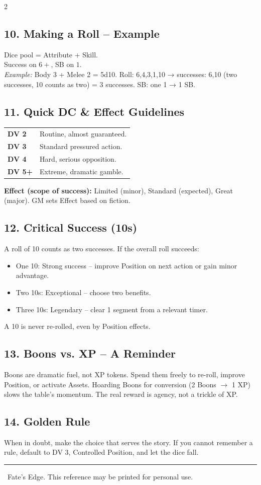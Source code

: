\documentclass[10pt,landscape]{article}
\begin{document}
\begin{multicols}{2}
\subsection*{10. Making a Roll – Example}
Dice pool = Attribute + Skill. \\
Success on $6+$, SB on $1$. \\
\textit{Example:} Body 3 + Melee 2 = 5d10. Roll: 6,4,3,1,10 → successes: 6,10 (two successes, 10 counts as two) = 3 successes. SB: one 1 → 1 SB.

\subsection*{11. Quick DC \& Effect Guidelines}
\begin{tabularx}{\linewidth}{X X}
\textbf{DV 2} & Routine, almost guaranteed. \\
\textbf{DV 3} & Standard pressured action. \\
\textbf{DV 4} & Hard, serious opposition. \\
\textbf{DV 5+} & Extreme, dramatic gamble. \\
\end{tabularx}
\vspace{0.5ex}
\textbf{Effect (scope of success):} Limited (minor), Standard (expected), Great (major). GM sets Effect based on fiction.

\subsection*{12. Critical Success (10s)}
A roll of 10 counts as two successes. If the overall roll succeeds:
\begin{itemize}
    \item One 10: Strong success – improve Position on next action or gain minor advantage.
    \item Two 10s: Exceptional – choose two benefits.
    \item Three 10s: Legendary – clear 1 segment from a relevant timer.
\end{itemize}
A 10 is never re-rolled, even by Position effects.

\subsection*{13. Boons vs. XP – A Reminder}
Boons are dramatic fuel, not XP tokens. Spend them freely to re-roll, improve Position, or activate Assets. Hoarding Boons for conversion (2 Boons $\rightarrow$ 1 XP) slows the table's momentum. The real reward is agency, not a trickle of XP.

\subsection*{14. Golden Rule}
When in doubt, make the choice that serves the story. If you cannot remember a rule, default to DV 3, Controlled Position, and let the dice fall.

\end{multicols}
\vspace{1ex}
\hrule
\begin{center}
\small \textcopyright\ Fate's Edge. This reference may be printed for personal use.
\end{center}
\end{document}

